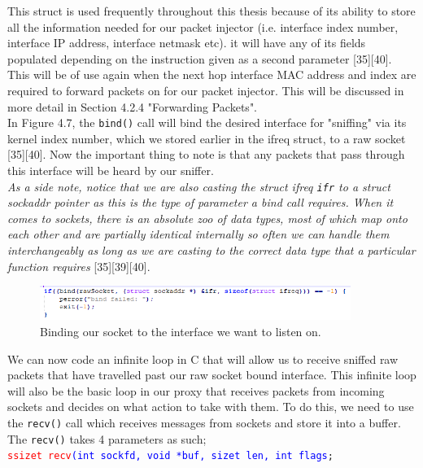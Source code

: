 \documentclass{uathesis}
\begin{document}
This struct is used frequently throughout this thesis because of its ability to store all the information needed for our packet injector (i.e. interface index number, interface IP address, interface netmask etc). it will have any of its fields populated depending on the instruction given as a second parameter [35][40]. This will be of use again when the next hop interface MAC address and index are required to forward packets on for our packet injector. This will be discussed in more detail in Section 4.2.4 "Forwarding Packets".\\
 
In Figure 4.7, the {\tt bind()} call will bind the desired interface for "sniffing" via its kernel index number, which we stored earlier in the ifreq struct, to a raw socket [35][40]. Now the important thing to note is that any packets that pass through this interface will be heard by our sniffer. \\

\emph{As a side note, notice that we are also casting the struct ifreq {\tt ifr} to a struct sockaddr pointer as this is the type of parameter a bind call requires. When it comes to sockets, there is an absolute zoo of data types, most of which map onto each other and are partially identical internally so often we can handle them interchangeably as long as we are casting to the correct data type that a particular function requires} [35][39][40].  \\

\begin{figure}[h!]
    \centering
    \includegraphics[width=0.9\textwidth]{Bind.PNG}
    \caption{Binding our socket to the interface we want to listen on. }
    \label{fig: Raw Socket Traversal}
\end{figure}

We can now code an infinite loop in C that will allow us to receive sniffed raw packets that have travelled past our raw socket bound interface. This infinite loop will also be the basic loop in our proxy that receives packets from incoming sockets and decides on what action to take with them. To do this, we need to use the {\tt recv()} call which receives messages from sockets and store it into a buffer. The {\tt recv()} takes 4 parameters as such; \\
{\tt \textcolor{red}{ssize\textunderscore t\ recv}\textcolor{blue}{(int sockfd, void *buf, size\textunderscore t len, int flags};}\\
\end{document}
